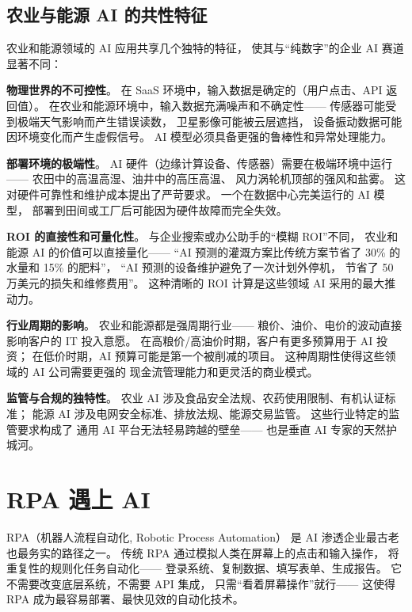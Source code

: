 \subsection{农业与能源 AI 的共性特征}

农业和能源领域的 AI 应用共享几个独特的特征，
使其与``纯数字''的企业 AI 赛道显著不同：

\textbf{物理世界的不可控性}。
在 SaaS 环境中，输入数据是确定的（用户点击、API 返回值）。
在农业和能源环境中，输入数据充满噪声和不确定性——
传感器可能受到极端天气影响而产生错误读数，
卫星影像可能被云层遮挡，
设备振动数据可能因环境变化而产生虚假信号。
AI 模型必须具备更强的鲁棒性和异常处理能力。

\textbf{部署环境的极端性}。
AI 硬件（边缘计算设备、传感器）需要在极端环境中运行——
农田中的高温高湿、油井中的高压高温、
风力涡轮机顶部的强风和盐雾。
这对硬件可靠性和维护成本提出了严苛要求。
一个在数据中心完美运行的 AI 模型，
部署到田间或工厂后可能因为硬件故障而完全失效。

\textbf{ROI 的直接性和可量化性}。
与企业搜索或办公助手的``模糊 ROI''不同，
农业和能源 AI 的价值可以直接量化——
``AI 预测的灌溉方案比传统方案节省了 30\% 的水量和 15\% 的肥料''，
``AI 预测的设备维护避免了一次计划外停机，
节省了 50 万美元的损失和维修费用''。
这种清晰的 ROI 计算是这些领域 AI 采用的最大推动力。

\textbf{行业周期的影响}。
农业和能源都是强周期行业——
粮价、油价、电价的波动直接影响客户的 IT 投入意愿。
在高粮价/高油价时期，客户有更多预算用于 AI 投资；
在低价时期，AI 预算可能是第一个被削减的项目。
这种周期性使得这些领域的 AI 公司需要更强的
现金流管理能力和更灵活的商业模式。

\textbf{监管与合规的独特性}。
农业 AI 涉及食品安全法规、农药使用限制、有机认证标准；
能源 AI 涉及电网安全标准、排放法规、能源交易监管。
这些行业特定的监管要求构成了
通用 AI 平台无法轻易跨越的壁垒——
也是垂直 AI 专家的天然护城河。


\section{RPA 遇上 AI}
\label{sec:ent-rpa}

RPA（机器人流程自动化, Robotic Process Automation）
是 AI 渗透企业最古老也最务实的路径之一。
传统 RPA 通过模拟人类在屏幕上的点击和输入操作，
将重复性的规则化任务自动化——
登录系统、复制数据、填写表单、生成报告。
它不需要改变底层系统，不需要 API 集成，
只需``看着屏幕操作''就行——
这使得 RPA 成为最容易部署、最快见效的自动化技术。

